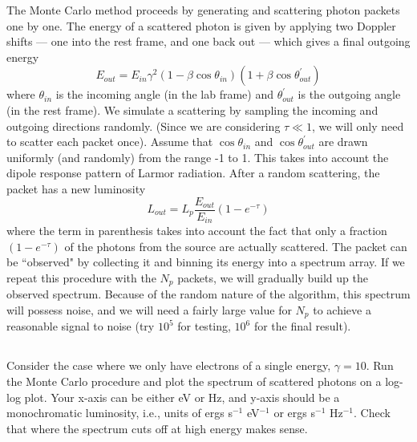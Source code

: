 \documentclass[11pt]{article}
\begin{document}
The Monte Carlo method proceeds by generating and scattering photon packets one
by one. The energy of a scattered photon is given by applying two Doppler
shifts --- one into the rest frame, and one back out --- which gives a final
outgoing energy
\begin{equation}
E_{out}=E_{in}\gamma^2(1-\beta\cos\theta_{in})(1+\beta\cos\theta^\prime_{out})
\end{equation}
where $\theta_{in}$ is the incoming angle (in the lab frame) and
$\theta^\prime_{out}$ is the outgoing angle (in the rest frame).  We simulate
a scattering by sampling the incoming and outgoing directions randomly. (Since
we are considering $\tau\ll1$, we will only need to scatter each packet once).
Assume that $\cos\theta_{in}$ and $\cos\theta^\prime_{out}$ are drawn uniformly (and randomly)
from the range -1 to 1. This takes into account the
dipole response pattern of Larmor radiation.
After a random scattering, the packet has a new luminosity
\begin{equation}
L_{out} = L_p\frac{E_{out}}{E_{in}}(1-e^{-\tau})
\end{equation}
where the term in parenthesis takes into account the fact that only a fraction
$(1-e^{-\tau})$ of the photons from the source are actually scattered.
The packet can be ``observed" by collecting it and binning
its energy into a spectrum array. If we repeat this procedure with 
the $N_p$ packets, we will gradually build up the observed spectrum. 
Because of the random nature of the algorithm, this spectrum will 
possess noise, and we will need a fairly large value for 
$N_p$ to achieve a reasonable signal to noise (try $10^5$ for testing,
$10^6$ for the final result).

\subsection{}
Consider the case where we only have electrons of a single energy, $\gamma=10$. Run
the Monte Carlo procedure and plot the spectrum of scattered photons on a
log-log plot. Your x-axis can be either eV or Hz, and y-axis should be a
monochromatic luminosity, i.e., units of ergs s$^{-1}$ eV$^{-1}$ or ergs s$^{-1}$ Hz$^{-1}$. 
Check that where the spectrum cuts off at
high energy makes sense.
\end{document}
